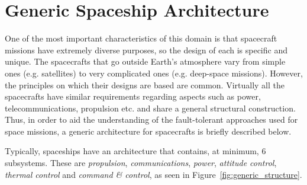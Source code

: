 \section{Generic Spaceship Architecture}
One of the most important characteristics of this domain is that spacecraft
missions have extremely diverse purposes, so the design of each is specific and
unique. The spacecrafts that go outside Earth's atmosphere vary from simple ones
(e.g. satellites) to very complicated ones (e.g. deep-space missions). However,
the principles on which their designs are based are common. Virtually all the
spacecrafts have similar requirements regarding aspects such as power,
telecommunications, propulsion etc. and share a general structural construction.
Thus, in order to aid the understanding of the fault-tolerant approaches used
for space missions, a generic architecture for spacecrafts is briefly described
below.

Typically, spaceships have an architecture that contains, at minimum, 6
subsystems\cite{ft-space-avionics}. These are \textit{propulsion},
\textit{communications}, \textit{power}, \textit{attitude control},
\textit{thermal control} and \textit{command \& control}, as seen in
Figure~\ref{fig:generic_structure}.

